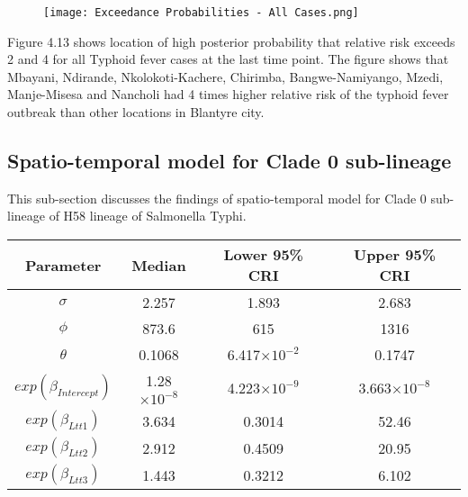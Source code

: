 \documentclass[a4paper]{thesis}
\begin{document}
\begin{figure}[h]
\begin{center}
\texttt{[image: Exceedance Probabilities - All Cases.png]}
\end{center}
\end{figure}

Figure 4.13 shows location of high posterior probability  that relative risk exceeds 2 and 4 for all Typhoid fever cases at the last time point. The figure shows that Mbayani, Ndirande, Nkolokoti-Kachere, Chirimba, Bangwe-Namiyango, Mzedi, Manje-Misesa and Nancholi had 4 times higher relative risk of the typhoid fever outbreak than other locations in Blantyre city.


\subsection{Spatio-temporal model for Clade 0 sub-lineage}

This sub-section discusses the findings of spatio-temporal model for Clade 0 sub-lineage of H58 lineage of Salmonella Typhi.

\begin{table}[h]
    \centering
    \begin{tabular}{cccc}
    \toprule
         Parameter & Median & Lower 95\% CRI & Upper 95\% CRI\\ \midrule
        $\sigma$ & 2.257 & 1.893 & 2.683 \\
        $\phi$ & 873.6 & 615 & 1316 \\
        $\theta$ & 0.1068 & 6.417$\times10^{-2}$ & 0.1747 \\
        $exp(\beta_{Intercept})$ & 1.28$\times10^{-8}$ & 4.223$\times10^{-9}$ & 3.663$\times10^{-8}$ \\
        $exp(\beta_{Ltt1})$ & 3.634 & 0.3014 & 52.46 \\
        $exp(\beta_{Ltt2})$ & 2.912 & 0.4509 & 20.95 \\
        $exp(\beta_{Ltt3})$ & 1.443 & 0.3212 & 6.102 \\
        \bottomrule
    \end{tabular}
\end{table}
\end{document}
